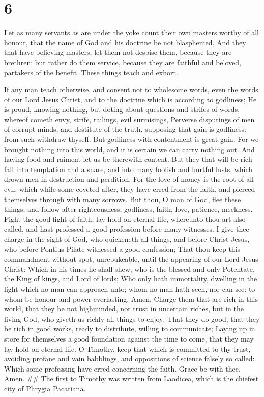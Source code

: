 \hypertarget{section-5}{%
\section{6}\label{section-5}}

 Let as many servants as are under the yoke count their own
masters worthy of all honour, that the name of God and his doctrine be
not blasphemed.  And they that have believing masters, let
them not despise them, because they are brethren; but rather do them
service, because they are faithful and beloved, partakers of the
benefit. These things teach and exhort.

 If any man teach otherwise, and consent not to wholesome
words, even the words of our Lord Jesus Christ, and to the doctrine
which is according to godliness;  He is proud, knowing
nothing, but doting about questions and strifes of words, whereof cometh
envy, strife, railings, evil surmisings,  Perverse
disputings of men of corrupt minds, and destitute of the truth,
supposing that gain is godliness: from such withdraw thyself.
 But godliness with contentment is great gain. 
For we brought nothing into this world, and it is certain we can carry
nothing out.  And having food and raiment let us be
therewith content.  But they that will be rich fall into
temptation and a snare, and into many foolish and hurtful lusts, which
drown men in destruction and perdition.  For the love of
money is the root of all evil: which while some coveted after, they have
erred from the faith, and pierced themselves through with many sorrows.
 But thou, O man of God, flee these things; and follow
after righteousness, godliness, faith, love, patience, meekness.
 Fight the good fight of faith, lay hold on eternal life,
whereunto thou art also called, and hast professed a good profession
before many witnesses.  I give thee charge in the sight of
God, who quickeneth all things, and before Christ Jesus, who before
Pontius Pilate witnessed a good confession;  That thou keep
this commandment without spot, unrebukeable, until the appearing of our
Lord Jesus Christ:  Which in his times he shall shew, who
is the blessed and only Potentate, the King of kings, and Lord of lords;
 Who only hath immortality, dwelling in the light which no
man can approach unto; whom no man hath seen, nor can see: to whom be
honour and power everlasting. Amen.  Charge them that are
rich in this world, that they be not highminded, nor trust in uncertain
riches, but in the living God, who giveth us richly all things to enjoy;
 That they do good, that they be rich in good works, ready
to distribute, willing to communicate;  Laying up in store
for themselves a good foundation against the time to come, that they may
lay hold on eternal life.  O Timothy, keep that which is
committed to thy trust, avoiding profane and vain babblings, and
oppositions of science falsely so called:  Which some
professing have erred concerning the faith. Grace be with thee. Amen.
\#\# The first to Timothy was written from Laodicea, which is the
chiefest city of Phrygia Pacatiana.
